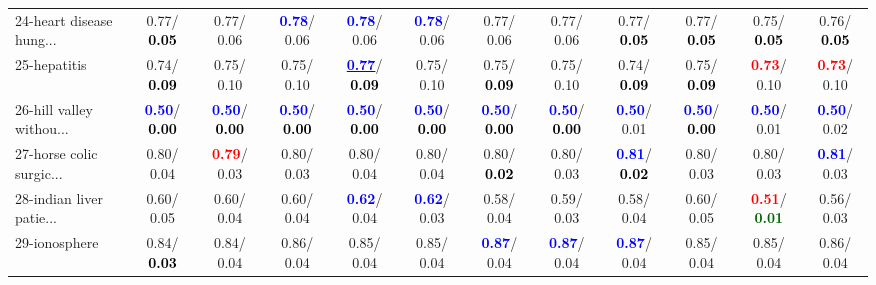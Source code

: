 \begin{table}[h]
\begin{center}
{\begin{tabular}{lc|c|c|c|c|c|c|c|c|c|c}
24-heart disease hung... &   0.77/\textcolor{black}{\textbf{  0.05}} &   0.77/  0.06 & \textcolor{blue}{\textbf{  0.78}}/  0.06 & \textcolor{blue}{\textbf{  0.78}}/  0.06 & \textcolor{blue}{\textbf{  0.78}}/  0.06 &   0.77/  0.06 &   0.77/  0.06 &   0.77/\textcolor{black}{\textbf{  0.05}} &   0.77/\textcolor{black}{\textbf{  0.05}} &   0.75/\textcolor{black}{\textbf{  0.05}} &   0.76/\textcolor{black}{\textbf{  0.05}} \\
25-hepatitis &   0.74/\textcolor{black}{\textbf{  0.09}} &   0.75/  0.10 &   0.75/  0.10 & \underline{\textcolor{blue}{\textbf{  0.77}}}/\textcolor{black}{\textbf{  0.09}} &   0.75/  0.10 &   0.75/\textcolor{black}{\textbf{  0.09}} &   0.75/  0.10 &   0.74/\textcolor{black}{\textbf{  0.09}} &   0.75/\textcolor{black}{\textbf{  0.09}} & \textcolor{red}{\textbf{  0.73}}/  0.10 & \textcolor{red}{\textbf{  0.73}}/  0.10 \\
26-hill valley withou... & \textcolor{blue}{\textbf{  0.50}}/\textcolor{black}{\textbf{  0.00}} & \textcolor{blue}{\textbf{  0.50}}/\textcolor{black}{\textbf{  0.00}} & \textcolor{blue}{\textbf{  0.50}}/\textcolor{black}{\textbf{  0.00}} & \textcolor{blue}{\textbf{  0.50}}/\textcolor{black}{\textbf{  0.00}} & \textcolor{blue}{\textbf{  0.50}}/\textcolor{black}{\textbf{  0.00}} & \textcolor{blue}{\textbf{  0.50}}/\textcolor{black}{\textbf{  0.00}} & \textcolor{blue}{\textbf{  0.50}}/\textcolor{black}{\textbf{  0.00}} & \textcolor{blue}{\textbf{  0.50}}/  0.01 & \textcolor{blue}{\textbf{  0.50}}/\textcolor{black}{\textbf{  0.00}} & \textcolor{blue}{\textbf{  0.50}}/  0.01 & \textcolor{blue}{\textbf{  0.50}}/  0.02 \\
27-horse colic surgic... &   0.80/  0.04 & \textcolor{red}{\textbf{  0.79}}/  0.03 &   0.80/  0.03 &   0.80/  0.04 &   0.80/  0.04 &   0.80/\textcolor{black}{\textbf{  0.02}} &   0.80/  0.03 & \textcolor{blue}{\textbf{  0.81}}/\textcolor{black}{\textbf{  0.02}} &   0.80/  0.03 &   0.80/  0.03 & \textcolor{blue}{\textbf{  0.81}}/  0.03 \\
28-indian liver patie... &   0.60/  0.05 &   0.60/  0.04 &   0.60/  0.04 & \textcolor{blue}{\textbf{  0.62}}/  0.04 & \textcolor{blue}{\textbf{  0.62}}/  0.03 &   0.58/  0.04 &   0.59/  0.03 &   0.58/  0.04 &   0.60/  0.05 & \textcolor{red}{\textbf{  0.51}}/\textcolor{darkgreen}{\textbf{  0.01}} &   0.56/  0.03 \\ \hline
29-ionosphere &   0.84/\textcolor{black}{\textbf{  0.03}} &   0.84/  0.04 &   0.86/  0.04 &   0.85/  0.04 &   0.85/  0.04 & \textcolor{blue}{\textbf{  0.87}}/  0.04 & \textcolor{blue}{\textbf{  0.87}}/  0.04 & \textcolor{blue}{\textbf{  0.87}}/  0.04 &   0.85/  0.04 &   0.85/  0.04 &   0.86/  0.04 \\

\end{tabular}}
\end{center}
\end{table}
